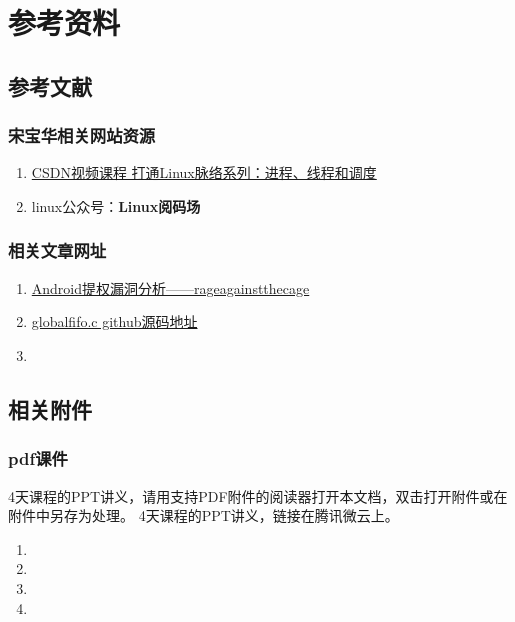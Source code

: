 

\partabstractfp{}
\part{参考资料}
\chapter{参考文献}
\section{宋宝华相关网站资源}
\begin{enumerate}
  \item \href{https://edu.csdn.net/course/detail/5995}{CSDN视频课程 打通Linux脉络系列：进程、线程和调度}
  \item linux公众号：\textbf{Linux阅码场}
\end{enumerate}

\section{相关文章网址}
\begin{enumerate}
  \item \href{https://blog.csdn.net/feglass/article/details/46403501}{Android提权漏洞分析——rageagainstthecage}
  \item \href{https://github.com/21cnbao/training/blob/master/kernel/drivers/globalfifo/ch12/globalfifo.c}{globalfifo.c github源码地址}
  \item 
\end{enumerate}

\chapter{相关附件}
\section{pdf课件}
\ifattachpdffile
4天课程的PPT讲义，请用支持PDF附件的阅读器打开本文档，双击打开附件或在附件中另存为处理。
\else
4天课程的PPT讲义，链接在腾讯微云上。
\fi
\begin{enumerate}
  \item {}
  \item {}
  \item {}
  \item {}
\end{enumerate}



